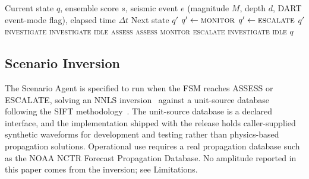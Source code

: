 \documentclass{article}
\begin{document}
\begin{algorithm}[t]
\caption{FSM State Transition}
\label{alg:fsm}
\begin{algorithmic}[1]
\REQUIRE Current state $q$, ensemble score $s$, seismic event $e$
  (magnitude $M$, depth $d$, DART event-mode flag), elapsed time $\Delta t$
\ENSURE Next state $q'$
  \STATE $q' \leftarrow \textsc{monitor}$ 
    \STATE $q' \leftarrow \textsc{escalate}$ 
  \ENDIF
  \RETURN $q'$
   \RETURN \textsc{investigate}
    \RETURN \textsc{investigate} 
   \RETURN \textsc{idle}
  \ENDIF
{}
   \RETURN \textsc{assess}
    \RETURN \textsc{assess} 
   \RETURN \textsc{monitor}
  \ENDIF
{}
    \RETURN \textsc{escalate}
   \RETURN \textsc{investigate}
  \ENDIF
{}
   \RETURN \textsc{idle}
  \ENDIF
\ENDIF
\RETURN $q$ 
\end{algorithmic}
\end{algorithm}

\subsection{Scenario Inversion}
\label{sec:scenario}

The Scenario Agent is specified to run when the FSM reaches ASSESS or
ESCALATE, solving an NNLS
inversion~\citep{lawson1974solving, percival2011extraction} against
a unit-source database following the SIFT
methodology~\citep{gica2008development}.  The unit-source database is a
declared interface, and the implementation shipped with the release
holds caller-supplied synthetic waveforms for development and testing
rather than physics-based propagation solutions.  Operational use
requires a real propagation database such as the NOAA NCTR Forecast
Propagation Database.  No amplitude reported in this paper comes from
the inversion; see Limitations.
\end{document}
